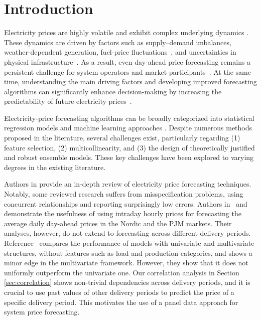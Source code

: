 \documentclass{article}
\begin{document}
\section{Introduction}
\label{Introduction}
Electricity prices are highly volatile and exhibit complex underlying dynamics \cite{bunn2004modelling}. These dynamics are driven by factors such as supply–demand imbalances, weather-dependent generation, fuel-price fluctuations~\cite{afanasyev2021fundamental}, and uncertainties in physical infrastructure~\citep{mosquera2019drivers, maciejowska2020assessing}. As a result, even day-ahead price forecasting remains a persistent challenge for system operators and market participants~\cite{karakatsani2008forecasting}. At the same time, understanding the main driving factors and developing improved forecasting algorithms can significantly enhance decision-making by increasing the predictability of future electricity prices~\cite{EI2006,EI2016,busch2023development}.

Electricity-price forecasting algorithms can be broadly categorized into statistical regression models and machine learning approaches \cite{weron2014electricity}. Despite numerous methods proposed in the literature, several challenges exist, particularly regarding (1) feature selection, (2) multicollinearity, and (3) the design of theoretically justified and robust ensemble models. These key challenges have been explored to varying degrees in the existing literature. 

Authors in \cite{lago2021forecasting} provide an in-depth review of electricity price forecasting techniques. Notably, some reviewed research suffers from misspecification problems, using concurrent relationships and reporting surprisingly low errors. Authors in~\cite{raviv2015forecasting} and~\cite{maciejowska2015forecasting} demonstrate the usefulness of using intraday hourly prices for forecasting the average daily day-ahead prices in the Nordic and the PJM markets. Their analyses, however, do not extend to forecasting across different delivery periods. Reference~\cite{marcjasz2018selection} compares the performance of models with univariate and multivariate structures, without features such as load and production categories, and shows a minor edge in the multivariate framework. However, they show that it does not uniformly outperform the univariate one. Our correlation analysis in Section \ref{sec:correlation} shows non-trivial dependencies across delivery periods, and it is crucial to use past values of other delivery periods to predict the price of a specific delivery period. This motivates the use of a panel data approach for system price forecasting.
\end{document}
